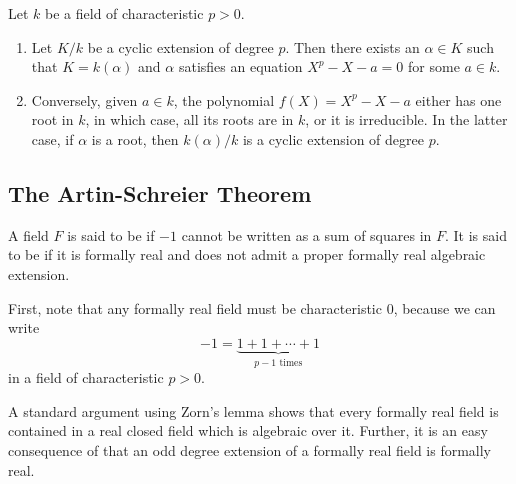 \begin{theorem}
    Let $k$ be a field of characteristic $p > 0$. 
    \begin{enumerate}[label=(\arabic*)]
        \item Let $K/k$ be a cyclic extension of degree $p$. Then there exists an $\alpha\in K$ such that $K = k(\alpha)$ and $\alpha$ satisfies an equation $X^p - X - a = 0$ for some $a\in k$. 
        \item Conversely, given $a\in k$, the polynomial $f(X) = X^p - X - a$ either has one root in $k$, in which case, all its roots are in $k$, or it is irreducible. In the latter case, if $\alpha$ is a root, then $k(\alpha)/k$ is a cyclic extension of degree $p$.
    \end{enumerate}
\end{theorem}

\subsection{The Artin-Schreier Theorem}

\begin{definition}
    A field $F$ is said to be  if $-1$ cannot be written as a sum of squares in $F$. It is said to be  if it is formally real and does not admit a proper formally real algebraic extension.
\end{definition}

\begin{remark}
    First, note that any formally real field must be characteristic $0$, because we can write 
    \begin{equation*}
        -1 = \underbrace{1 + 1 + \cdots + 1}_{p - 1\text{ times}}
    \end{equation*}
    in a field of characteristic $p > 0$. 
    
    A standard argument using Zorn's lemma shows that every formally real field is contained in a real closed field which is algebraic over it. Further, it is an easy consequence of \cite[Chapter V, Exercise 28]{lang-algebra} that an odd degree extension of a formally real field is formally real.
\end{remark}

